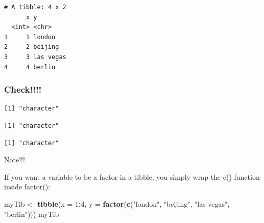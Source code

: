 \documentclass[
]{article}
\newenvironment{Shaded}{\begin{snugshade}}{\end{snugshade}}
\newcommand{\AttributeTok}[1]{\textcolor[rgb]{0.13,0.29,0.53}{#1}}
\newcommand{\DecValTok}[1]{\textcolor[rgb]{0.00,0.00,0.81}{#1}}
\newcommand{\FunctionTok}[1]{\textcolor[rgb]{0.13,0.29,0.53}{\textbf{#1}}}
\newcommand{\NormalTok}[1]{#1}
\newcommand{\OtherTok}[1]{\textcolor[rgb]{0.56,0.35,0.01}{#1}}
\newcommand{\SpecialCharTok}[1]{\textcolor[rgb]{0.81,0.36,0.00}{\textbf{#1}}}
\newcommand{\StringTok}[1]{\textcolor[rgb]{0.31,0.60,0.02}{#1}}
\begin{document}
\begin{verbatim}
# A tibble: 4 x 2
      x y        
  <int> <chr>    
1     1 london   
2     2 beijing  
3     3 las vegas
4     4 berlin   
\end{verbatim}

\subsubsection{Check!!!!}\label{check}

\begin{Shaded}
\end{Shaded}

\begin{verbatim}
[1] "character"
\end{verbatim}

\begin{Shaded}
\end{Shaded}

\begin{verbatim}
[1] "character"
\end{verbatim}

\begin{Shaded}
\end{Shaded}

\begin{verbatim}
[1] "character"
\end{verbatim}

Note!!!

If you want a variable to be a factor in a tibble, you simply wrap the
c() function inside factor():

\begin{Shaded}
\begin{Highlighting}[]
\NormalTok{myTib }\OtherTok{\textless{}{-}} \FunctionTok{tibble}\NormalTok{(}\AttributeTok{x =} \DecValTok{1}\SpecialCharTok{:}\DecValTok{4}\NormalTok{,}
                \AttributeTok{y =} \FunctionTok{factor}\NormalTok{(}\FunctionTok{c}\NormalTok{(}\StringTok{"london"}\NormalTok{, }\StringTok{"beijing"}\NormalTok{, }\StringTok{"las vegas"}\NormalTok{, }\StringTok{"berlin"}\NormalTok{)))}
\NormalTok{myTib}
\end{Highlighting}
\end{Shaded}
\end{document}
